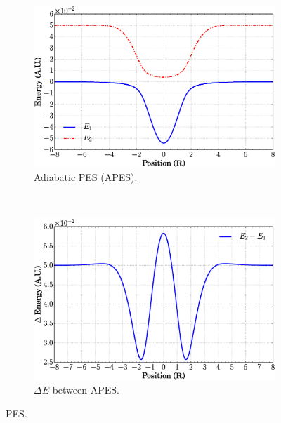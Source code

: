 \documentclass[xetex,mathserif,serif]{beamer}
\begin{document}
\begin{frame}
{\begin{figure}
\begin{subfigure}[t]{0.45\textwidth}
\includegraphics[width=\textwidth]{adcpes.eps}
\vspace{-0.2cm}
\caption{Adiabatic PES (APES).}
\label{f:apesdc}
\end{subfigure}
~
\begin{subfigure}[t]{0.45\textwidth}
\centering
\includegraphics[width=\textwidth]{del_adcpes.eps}
\vspace{-0.2cm}
\caption{$ \Delta E$ between APES.}
\label{f:delapesdc}
\end{subfigure}
\vspace{-0.35cm}
\caption{PES.}
\end{figure}
}
\end{frame}
\end{document}
